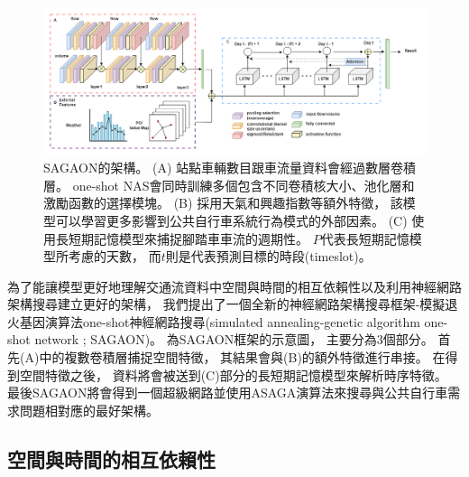 \documentclass[a4paper,14pt]{extarticle}
\begin{document}
        \begin{figure}[h]
            \includegraphics[width=\textwidth]{SAGAON.png}
            \caption{
                SAGAON的架構。
                (A) 站點車輛數目跟車流量資料會經過數層卷積層。
                one-shot NAS會同時訓練多個包含不同卷積核大小、池化層和激勵函數的選擇模塊。
                (B) 採用天氣和興趣指數等額外特徵，
                該模型可以學習更多影響到公共自行車系統行為模式的外部因素。
                (C) 使用長短期記憶模型來捕捉腳踏車車流的週期性。
                $P$代表長短期記憶模型所考慮的天數，
                而$t$則是代表預測目標的時段(timeslot)。
            }
            \label{fig:SAGAON}
        \end{figure}

        為了能讓模型更好地理解交通流資料中空間與時間的相互依賴性以及利用神經網路架構搜尋建立更好的架構，
        我們提出了一個全新的神經網路架構搜尋框架-模擬退火基因演算法one-shot神經網路搜尋(simulated annealing-genetic algorithm one-shot network ; SAGAON)。
        為SAGAON框架的示意圖，
        主要分為3個部分。
        首先(A)中的複數卷積層捕捉空間特徵，
        其結果會與(B)的額外特徵進行串接。
        在得到空間特徵之後，
        資料將會被送到(C)部分的長短期記憶模型來解析時序特徵。
        最後SAGAON將會得到一個超級網路並使用ASAGA演算法來搜尋與公共自行車需求問題相對應的最好架構。
        
        \subsection{空間與時間的相互依賴性}
            
\end{document}
